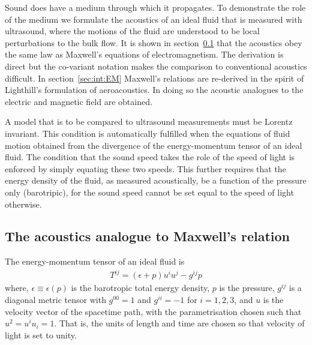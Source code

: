 \documentclass[10pt, fleqn,final,showtrims,oldfontcommands, article,a4paper,oneside]{memoir} %
\newcommand{\eqal}[2]{\begin{align}#1\label{eqn:#2}\end{align}}
\newcommand{\secref}[1]{section~\ref{sec:#1}}
\newcommand{\Poincare}{Poincar{\'e}\xspace}
\begin{document}
Sound does have a medium through which it propagates.
To demonstrate the role of the medium we formulate the acoustics of  an ideal fluid that is measured with ultrasound,
where the motions of the fluid are  understood to be local perturbations to the bulk flow.
It is shown in \secref{MaxwellAnalogue} that the acoustics  obey the same law as Maxwell's equations of electromagnetism.
The derivation is direct but the co-variant notation makes the comparison to conventional acoustics difficult.
In \secref{int:EM} Maxwell's relations are re-derived in the spirit of Lighthill's formulation of aeroacoustics.
In doing so the acoustic analogues to the electric and magnetic field are obtained.

%
A model that is to be compared to ultrasound measurements must be  Lorentz invariant.
This condition is  automatically fulfilled  when the equations of fluid motion obtained from the  divergence of the energy-momentum tensor of an ideal fluid.
The condition that the sound speed takes the role  of the speed of light
is enforced by simply equating these two speeds.
This further requires that the energy density of the fluid, as measured acoustically, be a function of the pressure only (barotripic),
for the sound speed cannot be set equal to the speed of light otherwise\cite{Taub1978}.

\subsection{The acoustics analogue to Maxwell's relation}\label{sec:MaxwellAnalogue}


The energy-momentum tensor of an ideal fluid is\cite{LandauBook, Taub1978}
\eqal{
  T^{i j} = (\epsilon + p) u^i u^j - g^{i j} p
}{EMtensor}
where, $\epsilon \equiv \epsilon(p)$ is the barotropic total energy density,
$p$ is the pressure,
$g^{i j}$ is a diagonal metric tensor with $g^{00}=1$ and $g^{i i} = -1$ for $i=1,2,3$,
and 
$u$ is the velocity vector of the spacetime path, with the parametrisation chosen such that $u^2 = u^i u_i = 1$. %
That is, the units of length and time are chosen so that velocity of light is set to unity.
\end{document}
